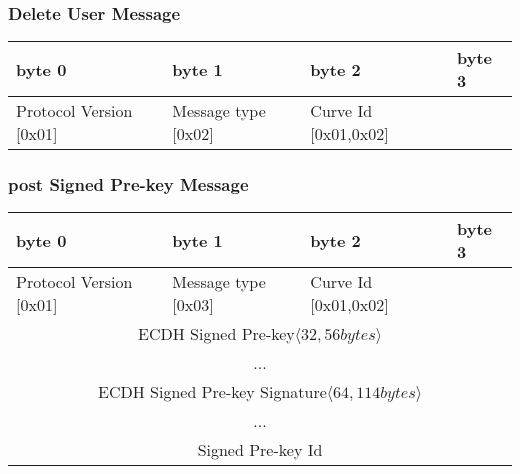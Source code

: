 \documentclass[a4paper,11pt]{article}
\begin{document}
    \subsubsection{Delete User Message}
      \begin{center}
      \begin{tabular}{ | p{1.4in} | p{1.4in} | p{1.4in} | p{1.4in} |}
        \hline
        \cellcolor[gray]{0.85} byte 0 & \cellcolor[gray]{0.85} byte 1 & \cellcolor[gray]{0.85} byte 2 & \cellcolor[gray]{0.85}byte 3\\
        \hline
        Protocol Version [0x01] & Message type [0x02] & Curve Id [0x01,0x02] & \\
        \hline
      \end{tabular}
      \end{center}

    \subsubsection{post Signed Pre-key Message}
      \begin{center}
      \begin{tabular}{ | p{1.4in} | p{1.4in} | p{1.4in} | p{1.4in} |}
        \hline
        \cellcolor[gray]{0.85} byte 0 & \cellcolor[gray]{0.85} byte 1 & \cellcolor[gray]{0.85} byte 2 & \cellcolor[gray]{0.85}byte 3\\
        \hline
        Protocol Version [0x01] & Message type [0x03] & Curve Id [0x01,0x02] & \\
        \cline{1-3}
        \multicolumn{4}{|c|}{ECDH Signed Pre-key$\langle 32,56bytes\rangle $}\\
        \multicolumn{4}{|c|}{...}\\
        \hline
        \multicolumn{4}{|c|}{ECDH Signed Pre-key Signature$\langle 64,114bytes\rangle $}\\
        \multicolumn{4}{|c|}{...}\\
        \hline
        \multicolumn{4}{|c|}{Signed Pre-key Id}\\
        \hline
      \end{tabular}
      \end{center}
    
\end{document}
